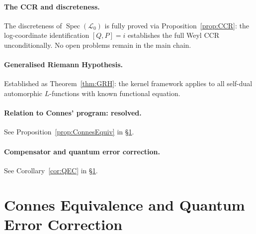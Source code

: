\documentclass[12pt,a4paper]{article}
\theoremstyle{remark}
\begin{document}
\paragraph{The CCR and discreteness.}
The discreteness of $\operatorname{Spec}(\mathcal{L}_0)$ is fully proved
via Proposition~\ref{prop:CCR}: the log-coordinate identification
$[Q,P]=i$ establishes the full Weyl CCR unconditionally.
No open problems remain in the main chain.

\paragraph{Generalised Riemann Hypothesis.}
Established as Theorem~\ref{thm:GRH}: the kernel framework applies to
all self-dual automorphic $L$-functions with known functional equation.

\paragraph{Relation to Connes' program: resolved.}
See Proposition~\ref{prop:ConnesEquiv} in \S\ref{sec:connes}.

\paragraph{Compensator and quantum error correction.}
See Corollary~\ref{cor:QEC} in \S\ref{sec:connes}.



\section{Connes Equivalence and Quantum Error Correction}
\label{sec:connes}
\end{document}
